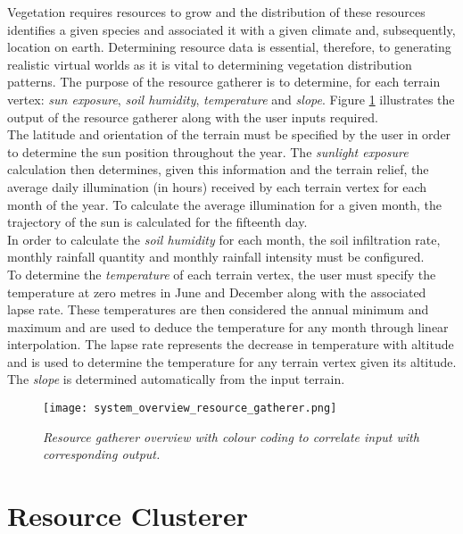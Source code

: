 Vegetation requires resources to grow and the distribution of these resources identifies a given species and associated it with a given climate and, subsequently, location on earth. Determining resource data is essential, therefore, to generating realistic virtual worlds as it is vital to determining vegetation distribution patterns. The purpose of the resource gatherer is to determine, for each terrain vertex: \textit{sun exposure}, \textit{soil humidity}, \textit{temperature} and \textit{slope}. Figure \ref{fig:system_overview_resource_gatherer} illustrates the output of the resource gatherer along with the user inputs required.\\
The latitude and orientation of the terrain must be specified by the user in order to determine the sun position throughout the year. The \textit{sunlight exposure} calculation then determines, given this information and the terrain relief, the average daily illumination (in hours) received by each terrain vertex for each month of the year. To calculate the average illumination for a given month, the trajectory of the sun is calculated for the fifteenth day. \\
In order to calculate the \textit{soil humidity} for each month, the soil infiltration rate, monthly rainfall quantity and monthly rainfall intensity must be configured.\\
To determine the \textit{temperature} of each terrain vertex, the user must specify the temperature at zero metres in June and December along with the associated lapse rate. These temperatures are then considered the annual minimum and maximum and are used to deduce the temperature for any month through linear interpolation. The lapse rate represents the decrease in temperature with altitude and is used to determine the temperature for any terrain vertex given its altitude. \\
The \textit{slope} is determined automatically from the input terrain.\\

\begin{figure}
\center
	\texttt{[image: system\_overview\_resource\_gatherer.png]}
	\caption{ \textit{Resource gatherer overview with colour coding to correlate input with corresponding output.}}	
	\label{fig:system_overview_resource_gatherer}
\end{figure}

\section{Resource Clusterer}

